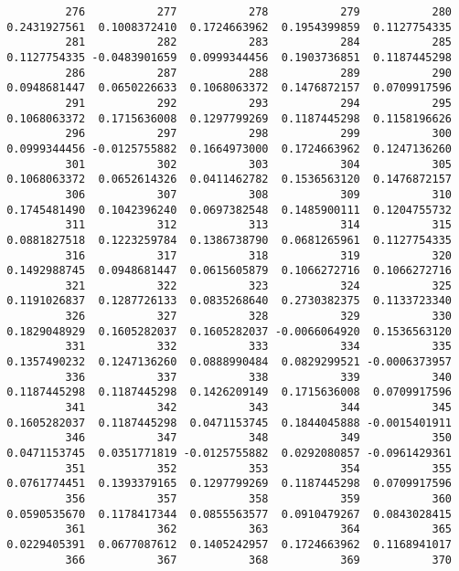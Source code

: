 \documentclass[
  letterpaper,
  DIV=11,
  numbers=noendperiod]{scrreprt}
\begin{document}
\begin{verbatim}
          276           277           278           279           280 
 0.2431927561  0.1008372410  0.1724663962  0.1954399859  0.1127754335 
          281           282           283           284           285 
 0.1127754335 -0.0483901659  0.0999344456  0.1903736851  0.1187445298 
          286           287           288           289           290 
 0.0948681447  0.0650226633  0.1068063372  0.1476872157  0.0709917596 
          291           292           293           294           295 
 0.1068063372  0.1715636008  0.1297799269  0.1187445298  0.1158196626 
          296           297           298           299           300 
 0.0999344456 -0.0125755882  0.1664973000  0.1724663962  0.1247136260 
          301           302           303           304           305 
 0.1068063372  0.0652614326  0.0411462782  0.1536563120  0.1476872157 
          306           307           308           309           310 
 0.1745481490  0.1042396240  0.0697382548  0.1485900111  0.1204755732 
          311           312           313           314           315 
 0.0881827518  0.1223259784  0.1386738790  0.0681265961  0.1127754335 
          316           317           318           319           320 
 0.1492988745  0.0948681447  0.0615605879  0.1066272716  0.1066272716 
          321           322           323           324           325 
 0.1191026837  0.1287726133  0.0835268640  0.2730382375  0.1133723340 
          326           327           328           329           330 
 0.1829048929  0.1605282037  0.1605282037 -0.0066064920  0.1536563120 
          331           332           333           334           335 
 0.1357490232  0.1247136260  0.0888990484  0.0829299521 -0.0006373957 
          336           337           338           339           340 
 0.1187445298  0.1187445298  0.1426209149  0.1715636008  0.0709917596 
          341           342           343           344           345 
 0.1605282037  0.1187445298  0.0471153745  0.1844045888 -0.0015401911 
          346           347           348           349           350 
 0.0471153745  0.0351771819 -0.0125755882  0.0292080857 -0.0961429361 
          351           352           353           354           355 
 0.0761774451  0.1393379165  0.1297799269  0.1187445298  0.0709917596 
          356           357           358           359           360 
 0.0590535670  0.1178417344  0.0855563577  0.0910479267  0.0843028415 
          361           362           363           364           365 
 0.0229405391  0.0677087612  0.1405242957  0.1724663962  0.1168941017 
          366           367           368           369           370 

\end{verbatim}
\end{document}
